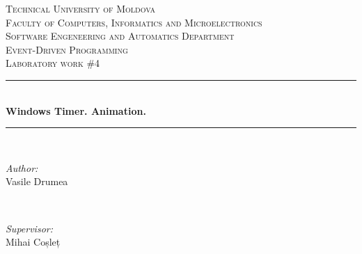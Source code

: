 \begin{titlepage}

  \begin{center} %

  \textsc{\large Technical University of Moldova}\\[0.5cm]
  \textsc{\large Faculty of Computers, Informatics and Microelectronics}\\[0.5cm] 
  \textsc{\large Software Engeneering and Automatics Department}\\[1.2cm]
  \vspace{25 mm}
  \textsc{\Large Event-Driven Programming}\\[0.5cm] %
  \textsc{\large Laboratory work \#4}\\[0.5cm] %

  \newcommand{\HRule}{\rule{\linewidth}{0.5mm}} %

  \vspace{10 mm}
  \HRule \\[0.4cm]
  { \LARGE \bfseries Windows Timer. Animation. }\\[0.4cm] %
  \HRule \\[1.5cm]

      \vspace{30mm}

      \begin{minipage}{0.4\textwidth}
      \begin{flushleft} \large
      \emph{Author:}\\
      Vasile Drumea
      \end{flushleft}
      \end{minipage}
      ~
      \begin{minipage}{0.4\textwidth}
      \begin{flushright} \large
      \emph{Supervisor:} \\
      Mihai Coșleț %
      \end{flushright}
      \end{minipage}\\[4cm]
  

\end{center}
\end{titlepage}
